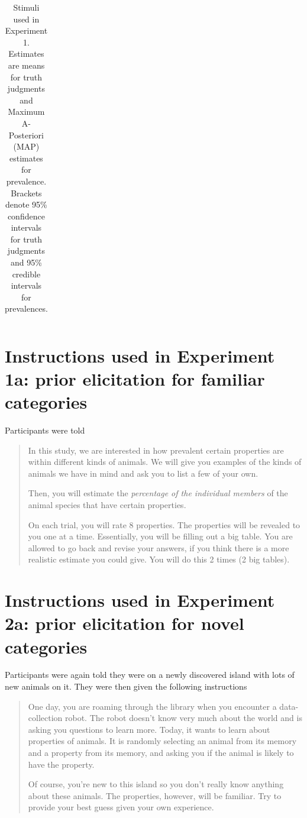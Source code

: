 \documentclass[10pt,letterpaper]{article}
\begin{document}
\begin{table}[h]
\begin{tabular}{| l | l | p{3.5cm} | p{3.5cm} |}
\end{tabular}
\caption{Stimuli used in Experiment 1. Estimates are means for truth judgments and Maximum A-Posteriori (MAP) estimates for prevalence.  Brackets denote 95\% confidence intervals for truth judgments and 95\% credible intervals for prevalences.}
\label{tab:expt1}
\end{table}


\section{Instructions used in Experiment 1a: prior elicitation for familiar categories}
\label{sec:prior1instruct}

Participants were told 
\begin{quote}
In this study, we are interested in how prevalent certain properties are within different kinds of animals. We will give you examples of the kinds of animals we have in mind and ask you to list a few of your own.

Then, you will estimate the \emph{percentage of the individual members} of the animal species that have certain properties.

On each trial, you will rate 8 properties. The properties will be revealed to you one at a time. Essentially, you will be filling out a big table. You are allowed to go back and revise your answers, if you think there is a more realistic estimate you could give. You will do this 2 times (2 big tables). 

\end{quote}


\section{Instructions used in Experiment 2a: prior elicitation for novel categories}
\label{sec:prior2instruct}

Participants were again told they were on a newly discovered island with lots of new animals on it. They were then given the following instructions

\begin{quote}
One day, you are roaming through the library when you encounter a data-collection robot. The robot doesn't know very much about the world and is asking you questions to learn more. Today, it wants to learn about properties of animals. It is randomly selecting an animal from its memory and a property from its memory, and asking you if the animal is likely to have the property.

Of course, you're new to this island so you don't really know anything about these animals. The properties, however, will be familiar. Try to provide your best guess given your own experience.
\end{quote}
\end{document}
